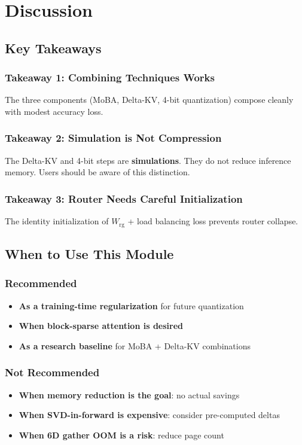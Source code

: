 \section{Discussion}

\subsection{Key Takeaways}

\subsubsection{Takeaway 1: Combining Techniques Works}

The three components (MoBA, Delta-KV, 4-bit quantization) compose cleanly 
with modest accuracy loss.

\subsubsection{Takeaway 2: Simulation is Not Compression}

The Delta-KV and 4-bit steps are \textbf{simulations}. They do not reduce 
inference memory. Users should be aware of this distinction.

\subsubsection{Takeaway 3: Router Needs Careful Initialization}

The identity initialization of $W_\text{rg}$ + load balancing loss prevents 
router collapse.

\subsection{When to Use This Module}

\subsubsection{Recommended}
\begin{itemize}
\item \textbf{As a training-time regularization} for future quantization
\item \textbf{When block-sparse attention is desired}
\item \textbf{As a research baseline} for MoBA + Delta-KV combinations

\end{itemize}
\subsubsection{Not Recommended}
\begin{itemize}
\item \textbf{When memory reduction is the goal}: no actual savings
\item \textbf{When SVD-in-forward is expensive}: consider pre-computed deltas
\item \textbf{When 6D gather OOM is a risk}: reduce page count

\end{itemize}
